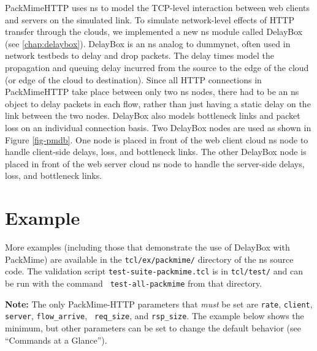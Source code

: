 PackMimeHTTP uses ns to model the TCP-level interaction between web
clients and servers on the simulated link. To simulate network-level
effects of HTTP transfer through the clouds, we implemented a new ns
module called DelayBox (see \ref{chap:delaybox}). DelayBox is an ns
analog to dummynet, often used in network testbeds to delay and drop
packets. The delay times model the propagation and queuing delay
incurred from the source to the edge of the cloud (or edge of the
cloud to destination). Since all HTTP connections in PackMimeHTTP take
place between only two ns nodes, there had to be an ns object to delay
packets in each flow, rather than just having a static delay on the
link between the two nodes. DelayBox also models bottleneck links and
packet loss on an individual connection basis. Two DelayBox nodes are
used as shown in Figure \ref{fig-pmdb}. One node is placed in front of
the web client cloud ns node to handle client-side delays, loss, and
bottleneck links. The other DelayBox node is placed in front of the
web server cloud ns node to handle the server-side delays, loss, and
bottleneck links.

\section{Example}
More examples (including those that demonstrate the use of DelayBox
with PackMime) are available in the {\tt tcl/ex/packmime/} directory of the
ns source code.  The validation script {\tt test-suite-packmime.tcl}
is in {\tt tcl/test/} and can be run with the command {\tt
test-all-packmime} from that directory.

\textbf{Note:}  The only PackMime-HTTP parameters that \emph{must} be set are
       {\tt rate}, {\tt client}, {\tt server}, {\tt flow\_arrive}, {\tt
       req\_size}, and {\tt rsp\_size}.  The example below shows the
       minimum, but other parameters can be set to change the default
       behavior (see ``Commands at a Glance''). 


